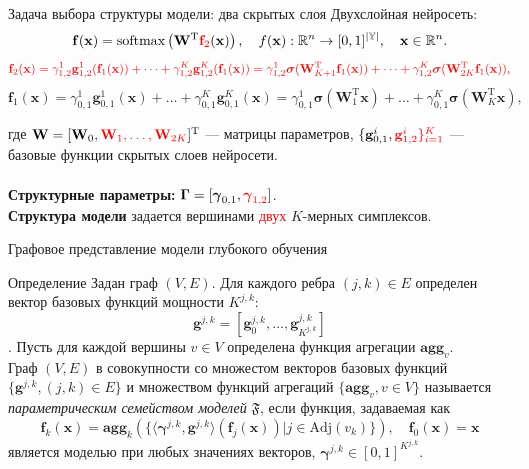\documentclass[usenames,dvipsnames,10pt,pdf,utf8,russian,aspectratio=43]{beamer}
\begin{document}
\begin{frame}{Задача выбора структуры модели: два скрытых слоя}
\small
Двухслойная нейросеть:
\[
    \mathbf{f}(\mathbf{x}) = \text{softmax}\left(\mathbf{W}^\text{T}\textcolor{red}{\mathbf{f}_2}(\mathbf{x})\right), \quad f(\mathbf{x}): \mathbb{R}^n \to [0,1]^{|\mathbb{Y}|}, \quad \mathbf{x} \in \mathbb{R}^n.
\]
\[
\textcolor{red}{
\mathbf{f}_2(\mathbf{x}) = {\gamma}_{1,2}^{1}\mathbf{g}_{1,2}^{1}(\mathbf{f}_1(\mathbf{x}))+\dots+{\gamma}_{1,2}^{K}\mathbf{g}_{1,2}^{K}(\mathbf{f}_1(\mathbf{x}))= {\gamma}_{1,2}^{1}\boldsymbol{\sigma}(\mathbf{W}_{K+1}^\text{T}\mathbf{f}_1(\mathbf{x})) + \dots +  {\gamma}_{1,2}^{K}\boldsymbol{\sigma}(\mathbf{W}_{2K}^\text{T}\mathbf{f}_1(\mathbf{x})),}
\]
\[
\mathbf{f}_1(\mathbf{x}) = {\gamma}_{0,1}^{1}\mathbf{g}_{0,1}^{1}(\mathbf{x})+\dots+{\gamma}_{0,1}^{K}\mathbf{g}_{0,1}^{K}(\mathbf{x})= {\gamma}_{0,1}^{1}\boldsymbol{\sigma}(\mathbf{W}_1^\text{T}\mathbf{x}) + \dots +  {\gamma}_{0,1}^{K}\boldsymbol{\sigma}(\mathbf{W}_K^\text{T}\mathbf{x}),
\]

где $\mathbf{W} = [\mathbf{W}_0,\textcolor{red}{\mathbf{W}_1, \dots, \mathbf{W}_{2K}}]^{\text{T}}$ --- матрицы параметров, $\{\mathbf{g}^{i}_{0,1}, \textcolor{red}{\mathbf{g}^{i}_{1,2}\}_{i=1}^K}$ --- базовые функции скрытых слоев нейросети.~\\~\\

\textbf{Структурные параметры:} $\boldsymbol{\Gamma} = [\boldsymbol{\gamma}_{0,1}, \textcolor{red}{\boldsymbol{\gamma}_{1,2}}]$.\\
\textbf{Структура модели} задается вершинами \textcolor{red}{двух} $K$-мерных симплексов.
\end{frame}


        


\begin{frame}{Графовое представление модели глубокого обучения}
\begin{block}{Определение}
Задан  граф $(V,E)$. Для каждого ребра $(j,k) \in E$ определен вектор базовых функций  мощности $K^{j,k}$: $$\mathbf{g}^{j,k} = [\mathbf{g}^{j,k}_0, \dots, \mathbf{g}^{j,k}_{K^{j,k}}]$$. Пусть для каждой вершины $v \in V$ определена функция агрегации $\textbf{agg}_v$.\\ Граф $(V, E)$ в совокупности со множестом векторов базовых функций $\{\mathbf{g}^{j,k}, (j,k) \in E\}$ и множеством функций агрегаций $\{ \textbf{agg}_v, {v \in V}\}$ называется \textit{параметрическим семейством моделей} $\mathfrak{F}$, если функция, задаваемая как 
\begin{equation}
\label{eq:modelfam}
    \mathbf{f}_k(\mathbf{x}) = \textbf{agg}_k\left(\{ \langle \boldsymbol{\gamma}^{j,k}, \mathbf{g}^{j,k} \rangle \left(\mathbf{f}_j(\mathbf{x})\right)| j \in \text{Adj}(v_k)\}\right), \quad \mathbf{f}_0(\mathbf{x}) = \mathbf{x}
\end{equation}
является моделью при любых значениях векторов, $\boldsymbol{\gamma}^{j,k} \in [0,1]^{K^{j,k}}$.

\end{block}
\end{frame}
\end{document}
